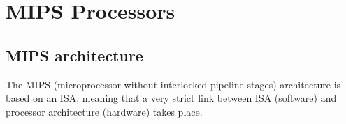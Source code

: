 \chapter{MIPS Processors}
\section {MIPS architecture}
The MIPS (microprocessor without interlocked pipeline stages) architecture is
based on an ISA, meaning that a very strict link between ISA (software) and
processor architecture (hardware) takes place.
